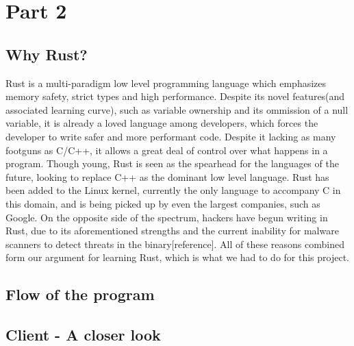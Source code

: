 \documentclass[../main.tex]{subfiles}
\begin{document}
	\chapter{Part 2}


	\section{Why Rust?}


Rust is a multi-paradigm low level programming language which emphasizes memory safety, strict types and high performance. Despite its novel features(and associated learning curve),
such as variable ownership and its ommission of a null variable, it is already a loved language among developers, which forces the developer to write safer and more performant code.
Despite it lacking as many footguns as C/C++, it allows a great deal of control over what happens in a program. Though young, Rust is seen as the spearhead for the languages of the 
future, looking to replace C++ as the dominant low level language. Rust has been added to the Linux kernel, currently the only language to accompany C in this domain, and is being 
picked up by even the largest companies, such as Google. On the opposite side of the spectrum, hackers have begun writing in Rust, due to its aforementioned strengths and the 
current inability for malware scanners to detect threats in the binary[reference]. All of these reasons combined form our argument for learning Rust, which is what we had to do for
this project.

	\vspace{10pt}

	\section{Flow of the program}

    \vspace{10pt}
	\section{Client - A closer look}
\end{document}
